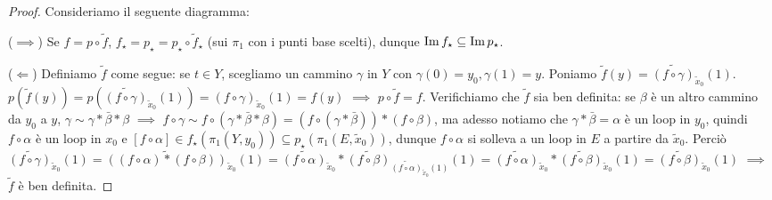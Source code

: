 \begin{proof}
  Consideriamo il seguente diagramma:
  \begin{center}
  \end{center}
  ($\implies$) Se $f=p \circ \tilde{f}$, $f_{\star}=p_{\star}=p_{\star} \circ \tilde{f}_{\star}$ (sui $\pi_1$ con i punti base scelti), dunque $\operatorname{Im}{f_{\star}} \subseteq \operatorname{Im}{p_{\star}}$.

  ($\Leftarrow$) Definiamo $\tilde{f}$ come segue: se $t \in Y$, scegliamo un cammino $\gamma$ in $Y$ con $\gamma(0)=y_0, \gamma(1)=y$. Poniamo $\tilde{f}(y)=\widetilde{(f \circ \gamma)}_{\tilde{x}_0}(1)$.
  $p(\tilde{f}(y))=p(\widetilde{(f \circ \gamma)}_{\tilde{x}_0}(1))=(f \circ \gamma)_{\tilde{x}_0}(1)=f(y)$ $\implies$ $p \circ \tilde{f}=f$.
  Verifichiamo che $\tilde{f}$ sia ben definita: se $\beta$ è un altro cammino da $y_0$ a $y$, $\gamma \sim \gamma * \bar{\beta}*\beta$ $\implies$ $f \circ \gamma \sim f \circ (\gamma * \bar{\beta}*\beta)=(f \circ (\gamma * \bar{\beta}))*(f \circ \beta)$,
  ma adesso notiamo che $\gamma *\bar{\beta}=\alpha$ è un loop in $y_0$, quindi $f \circ \alpha$ è un loop in $x_0$ e $[f \circ \alpha] \in f_{\star}(\pi_1(Y, y_0)) \subseteq p_{\star}(\pi_1(E, \tilde{x}_0))$, dunque $f \circ \alpha$ si solleva a un loop in $E$ a partire da $\tilde{x}_0$.
  Perciò $\widetilde{(f \circ \gamma)}_{\tilde{x}_0}(1)=\widetilde{((f \circ \alpha)*(f \circ \beta))}_{\tilde{x}_0}(1)=\widetilde{(f \circ \alpha)}_{\tilde{x}_0}*\widetilde{(f \circ \beta)}_{\widetilde{(f \circ \alpha)}_{\tilde{x}_0}(1)}(1)=\widetilde{(f \circ \alpha)}_{\tilde{x}_0}*\widetilde{(f \circ \beta)}_{\tilde{x}_0}(1)=\widetilde{(f \circ \beta)}_{\tilde{x}_0}(1)$
  $\implies$ $\tilde{f}$ è ben definita.


\end{proof}
